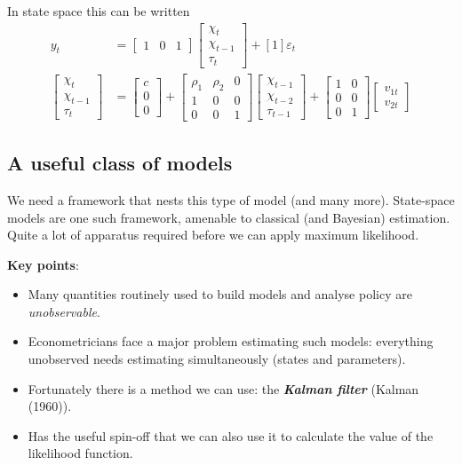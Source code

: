 \documentclass[
  letterpaper,
]{book}
\providecommand{\tightlist}{%
  \setlength{\itemsep}{0pt}\setlength{\parskip}{0pt}}\usepackage{longtable,booktabs,array}
\begin{document}
In state space this can be written \begin{align}
y_t &=
\begin{bmatrix} 1 & 0 & 1 \end{bmatrix}
 \begin{bmatrix} \chi_t \\ \chi_{t-1} \\ \tau_t \end{bmatrix} + [1] \varepsilon_t\\
 \begin{bmatrix} \chi_t \\ \chi_{t-1} \\ \tau_t \end{bmatrix} &=
\begin{bmatrix} c \\ 0 \\ 0 \end{bmatrix} +
 \begin{bmatrix} \rho_1 & \rho_2 & 0 \\ 1 & 0 & 0 \\ 0 & 0 & 1 \end{bmatrix}
\begin{bmatrix} \chi_{t-1} \\ \chi_{t-2} \\ \tau_{t-1} \end{bmatrix} +
 \begin{bmatrix} 1 & 0 \\ 0 & 0 \\ 0 & 1 \end{bmatrix}
\begin{bmatrix} v_{1t} \\ v_{2t} \end{bmatrix}
\end{align}

\hypertarget{a-useful-class-of-models}{%
\subsection{A useful class of models}\label{a-useful-class-of-models}}

We need a framework that nests this type of model (and many more).
State-space models are one such framework, amenable to classical (and
Bayesian) estimation. Quite a lot of apparatus required before we can
apply maximum likelihood.

\textbf{Key points}:

\begin{itemize}
\tightlist
\item
  Many quantities routinely used to build models and analyse policy are
  \emph{unobservable}.
\item
  Econometricians face a major problem estimating such models:
  everything unobserved needs estimating simultaneously (states and
  parameters).
\item
  Fortunately there is a method we can use: the \textbf{\emph{Kalman
  filter}} (Kalman (1960)).
\item
  Has the useful spin-off that we can also use it to calculate the value
  of the likelihood function.
\end{itemize}
\end{document}
